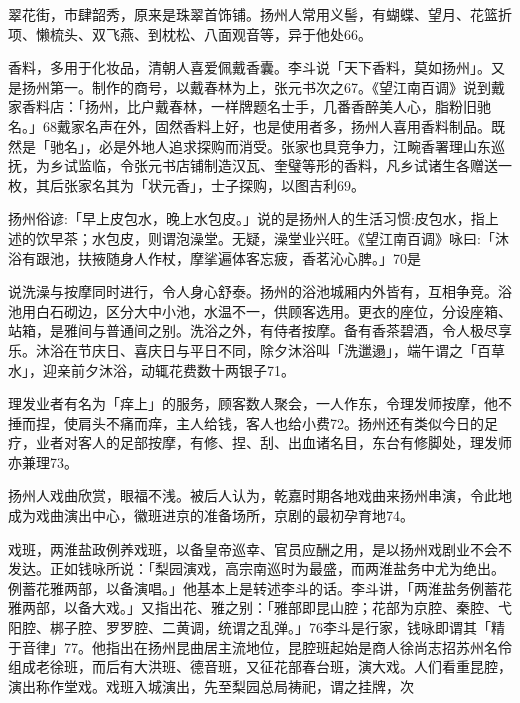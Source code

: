翠花街，市肆韶秀，原来是珠翠首饰铺。扬州人常用义髻，有蝴蝶、望月、花篮折项、懒梳头、双飞燕、到枕松、八面观音等，异于他处66。

香料，多用于化妆品，清朝人喜爱佩戴香囊。李斗说「天下香料，莫如扬州」。又是扬州第一。制作的商号，以戴春林为上，张元书次之67。《望江南百调》说到戴家香料店：「扬州，比户戴春林，一样牌题名士手，几番香醉美人心，脂粉旧驰名。」68戴家名声在外，固然香料上好，也是使用者多，扬州人喜用香料制品。既然是「驰名」，必是外地人追求探购而消受。张家也具竞争力，江畹香署理山东巡抚，为乡试监临，令张元书店铺制造汉瓦、奎璧等形的香料，凡乡试诸生各赠送一枚，其后张家名其为「状元香」，士子探购，以图吉利69。

扬州俗谚:「早上皮包水，晚上水包皮。」说的是扬州人的生活习惯:皮包水，指上述的饮早茶；水包皮，则谓泡澡堂。无疑，澡堂业兴旺。《望江南百调》咏曰:「沐浴有跟池，扶掖随身人作杖，摩挲遍体客忘疲，香茗沁心脾。」70是

\vfill
\begin{BookNotes}
\end{BookNotes}

\noindent 说洗澡与按摩同时进行，令人身心舒泰。扬州的浴池城厢内外皆有，互相争竞。浴池用白石砌边，区分大中小池，水温不一，供顾客选用。更衣的座位，分设座箱、站箱，是雅间与普通间之别。洗浴之外，有侍者按摩。备有香茶碧酒，令人极尽享乐。沐浴在节庆日、喜庆日与平日不同，除夕沐浴叫「洗邋遢」，端午谓之「百草水」，迎亲前夕沐浴，动辄花费数十两银子71。

理发业者有名为「痒上」的服务，顾客数人聚会，一人作东，令理发师按摩，他不捶而捏，使肩头不痛而痒，主人给钱，客人也给小费72。扬州还有类似今日的足疗，业者对客人的足部按摩，有修、捏、刮、出血诸名目，东台有修脚处，理发师亦兼理73。


扬州人戏曲欣赏，眼福不浅。被后人认为，乾嘉时期各地戏曲来扬州串演，令此地成为戏曲演出中心，徽班进京的准备场所，京剧的最初孕育地74。

戏班，两淮盐政例养戏班，以备皇帝巡幸、官员应酬之用，是以扬州戏剧业不会不发达。正如钱咏所说：「梨园演戏，高宗南巡时为最盛，而两淮盐务中尤为绝出。例蓄花雅两部，以备演唱。」他基本上是转述李斗的话。李斗讲，「两淮盐务例蓄花雅两部，以备大戏。」又指出花、雅之别：「雅部即昆山腔；花部为京腔、秦腔、弋阳腔、梆子腔、罗罗腔、二黄调，统谓之乱弹。」76李斗是行家，钱咏即谓其「精于音律」77。他指出在扬州昆曲居主流地位，昆腔班起始是商人徐尚志招苏州名伶组成老徐班，而后有大洪班、德音班，又征花部春台班，演大戏。人们看重昆腔，演出称作堂戏。戏班入城演出，先至梨园总局祷祀，谓之挂牌，次

